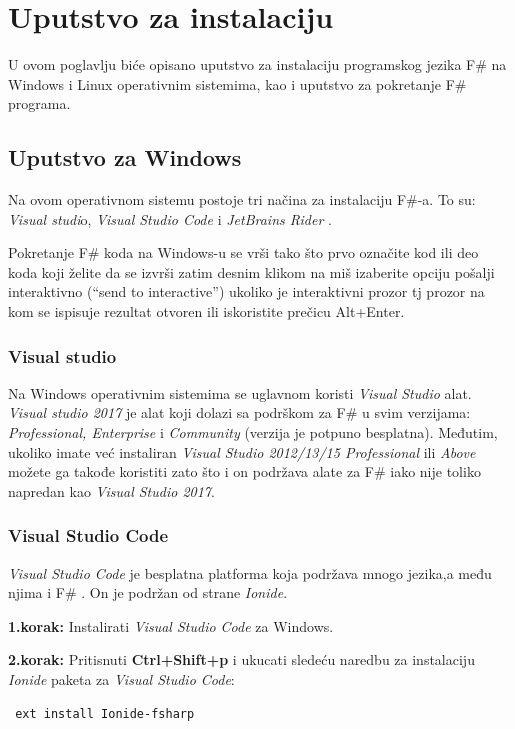 \documentclass[a4paper]{article}
\begin{document}
\section{Uputstvo za instalaciju}

U ovom poglavlju biće opisano uputstvo za instalaciju programskog jezika F\# na Windows i Linux operativnim sistemima, kao i uputstvo za pokretanje F\# programa.

\subsection{Uputstvo za Windows}

Na ovom operativnom sistemu postoje tri načina za instalaciju F\#-a. To su: {\em Visual studi}o\cite{vStud}, {\em Visual Studio Code} \cite{vStudCode} i {\em JetBrains Rider} \cite{jetBrains}.

Pokretanje F\# koda na Windows-u se vrši tako što prvo označite kod ili deo koda koji želite da se izvrši zatim desnim klikom na miš izaberite opciju pošalji interaktivno (“send to interactive”) ukoliko je interaktivni prozor tj prozor na kom se ispisuje rezultat otvoren ili iskoristite prečicu Alt+Enter.

\subsubsection{Visual studio}
	
Na Windows operativnim sistemima se uglavnom koristi {\em Visual Studio} alat. {\em Visual studio 2017} je alat koji dolazi sa podrškom za F\# u svim verzijama: {\em Professional, Enterprise} i {\em Community} (verzija je potpuno besplatna). Međutim, ukoliko imate  već instaliran {\em Visual Studio 2012/13/15  Professional} ili {\em Above} možete ga takođe koristiti zato što i on podržava alate za F\# iako nije toliko napredan kao {\em Visual Studio 2017}.

\subsubsection{Visual Studio Code}
	
{\em Visual Studio Code} je besplatna platforma koja podržava mnogo jezika,a među njima i F\# . On je podržan od strane {\em Ionide}\cite{ionide}.

\textbf{1.korak:} Instalirati {\em Visual Studio Code} za Windows.

\textbf{2.korak:} Pritisnuti \textbf{Ctrl+Shift+p} i ukucati sledeću naredbu za instalaciju {\em Ionide} paketa za {\em Visual Studio Code}:
\\
\begin{lstlisting}
 ext install Ionide-fsharp
\end{lstlisting}
 
\end{document}
